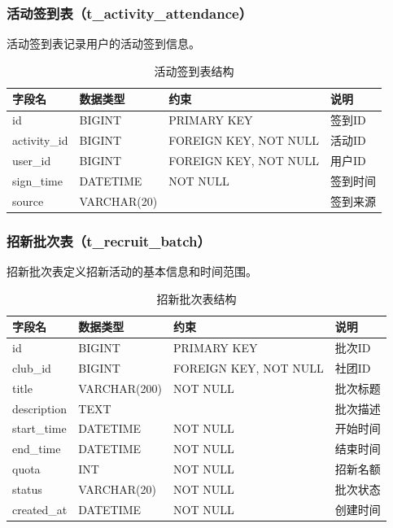 \subsubsection{活动签到表（t\_activity\_attendance）}

活动签到表记录用户的活动签到信息。

\begin{table}[H]
\centering
\caption{活动签到表结构}
\begin{tabular}{llll}
\toprule
字段名 & 数据类型 & 约束 & 说明 \\
\midrule
id & BIGINT & PRIMARY KEY & 签到ID \\
activity\_id & BIGINT & FOREIGN KEY, NOT NULL & 活动ID \\
user\_id & BIGINT & FOREIGN KEY, NOT NULL & 用户ID \\
sign\_time & DATETIME & NOT NULL & 签到时间 \\
source & VARCHAR(20) & & 签到来源 \\
\bottomrule
\end{tabular}
\end{table}

\subsubsection{招新批次表（t\_recruit\_batch）}

招新批次表定义招新活动的基本信息和时间范围。

\begin{table}[H]
\centering
\caption{招新批次表结构}
\begin{tabular}{llll}
\toprule
字段名 & 数据类型 & 约束 & 说明 \\
\midrule
id & BIGINT & PRIMARY KEY & 批次ID \\
club\_id & BIGINT & FOREIGN KEY, NOT NULL & 社团ID \\
title & VARCHAR(200) & NOT NULL & 批次标题 \\
description & TEXT & & 批次描述 \\
start\_time & DATETIME & NOT NULL & 开始时间 \\
end\_time & DATETIME & NOT NULL & 结束时间 \\
quota & INT & NOT NULL & 招新名额 \\
status & VARCHAR(20) & NOT NULL & 批次状态 \\
created\_at & DATETIME & NOT NULL & 创建时间 \\
\bottomrule
\end{tabular}
\end{table}

